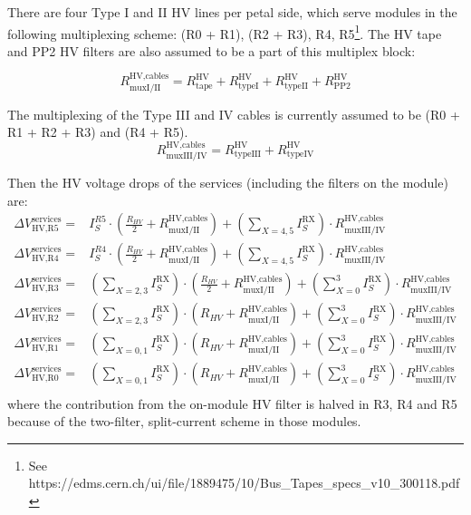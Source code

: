 There are four Type I and II HV lines per petal side, which serve modules in the following multiplexing
scheme: (R0 + R1), (R2 + R3), R4, R5\footnote{ See
https://edms.cern.ch/ui/file/1889475/10/Bus\_Tapes\_specs\_v10\_300118.pdf
}. The HV tape and PP2 HV filters are also assumed to be a part of this multiplex block:

\def\rhvmuxI{R^\text{HV,cables}_\text{muxI/II}}
\def\rhvmuxIII{R^\text{HV,cables}_\text{muxIII/IV}}
\def\rtape{R^\text{HV}_\text{tape}}
\def\rtypeI{R^\text{HV}_\text{typeI}}
\def\rtypeII{R^\text{HV}_\text{typeII}}
\def\rtypeIII{R^\text{HV}_\text{typeIII}}
\def\rtypeIV{R^\text{HV}_\text{typeIV}}
\[
\rhvmuxI = \rtape + \rtypeI + \rtypeII + R^\text{HV}_\text{PP2}
\]

The multiplexing of the Type III and IV cables is currently
assumed to be (R0 + R1 + R2 + R3) and (R4 + R5).
\[
\rhvmuxIII = \rtypeIII + \rtypeIV
\]

Then the HV voltage drops of the services (including the filters on the module) are:
\def\dvservices{\Delta V^\text{services}}
\begin{align}
\dvservices_\text{HV,R5} =&                                I^{R5}_S \cdot \left(\frac{R_{HV}}{2} +\rhvmuxI \right) + \left(\sum_{X=4,5} I^\text{RX}_S\right) \cdot \rhvmuxIII \\
\dvservices_\text{HV,R4} =&                                I^{R4}_S \cdot \left(\frac{R_{HV}}{2} +\rhvmuxI \right) + \left(\sum_{X=4,5} I^\text{RX}_S\right) \cdot \rhvmuxIII \\
\dvservices_\text{HV,R3} =& \left(\sum_{X=2,3} I^\text{RX}_S\right) \cdot \left(\frac{R_{HV}}{2} +\rhvmuxI \right) + \left(\sum^3_{X=0} I^\text{RX}_S\right) \cdot \rhvmuxIII \\
\dvservices_\text{HV,R2} =& \left(\sum_{X=2,3} I^\text{RX}_S\right) \cdot \left(R_{HV} +\rhvmuxI \right)           + \left(\sum^3_{X=0} I^\text{RX}_S\right) \cdot \rhvmuxIII \\
\dvservices_\text{HV,R1} =& \left(\sum_{X=0,1} I^\text{RX}_S\right) \cdot \left(R_{HV} +\rhvmuxI \right)           + \left(\sum^3_{X=0} I^\text{RX}_S\right) \cdot \rhvmuxIII \\
\dvservices_\text{HV,R0} =& \left(\sum_{X=0,1} I^\text{RX}_S\right) \cdot \left(R_{HV} +\rhvmuxI \right)           + \left(\sum^3_{X=0} I^\text{RX}_S\right) \cdot \rhvmuxIII \\
\end{align}
%
where the contribution from the on-module HV filter is halved in R3, R4 and R5 because of the
two-filter, split-current scheme in those modules.

